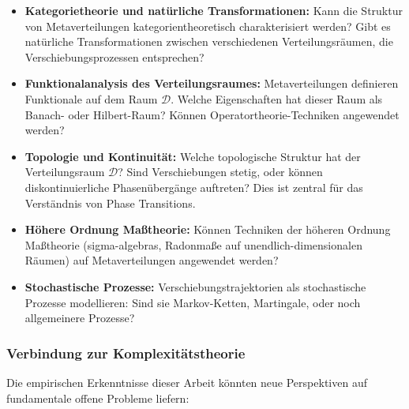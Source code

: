 ﻿\documentclass[a4paper,12pt]{article}
\theoremstyle{definition}
\begin{document}
\begin{itemize}
	\item \textbf{Kategorietheorie und natürliche Transformationen:} Kann die Struktur von Metaverteilungen kategorientheoretisch charakterisiert werden? Gibt es natürliche Transformationen zwischen verschiedenen Verteilungsräumen, die Verschiebungsprozessen entsprechen?
	
	\item \textbf{Funktionalanalysis des Verteilungsraumes:} Metaverteilungen definieren Funktionale auf dem Raum $\mathcal{D}$. Welche Eigenschaften hat dieser Raum als Banach- oder Hilbert-Raum? Können Operatortheorie-Techniken angewendet werden?
	
	\item \textbf{Topologie und Kontinuität:} Welche topologische Struktur hat der Verteilungsraum $\mathcal{D}$? Sind Verschiebungen stetig, oder können diskontinuierliche Phasenübergänge auftreten? Dies ist zentral für das Verständnis von Phase Transitions.
	
	\item \textbf{Höhere Ordnung Maßtheorie:} Können Techniken der höheren Ordnung Maßtheorie (sigma-algebras, Radonmaße auf unendlich-dimensionalen Räumen) auf Metaverteilungen angewendet werden?
	
	\item \textbf{Stochastische Prozesse:} Verschiebungstrajektorien als stochastische Prozesse modellieren: Sind sie Markov-Ketten, Martingale, oder noch allgemeinere Prozesse?
\end{itemize}

\subsubsection{Verbindung zur Komplexitätstheorie}

Die empirischen Erkenntnisse dieser Arbeit könnten neue Perspektiven auf fundamentale offene Probleme liefern:
\end{document}

